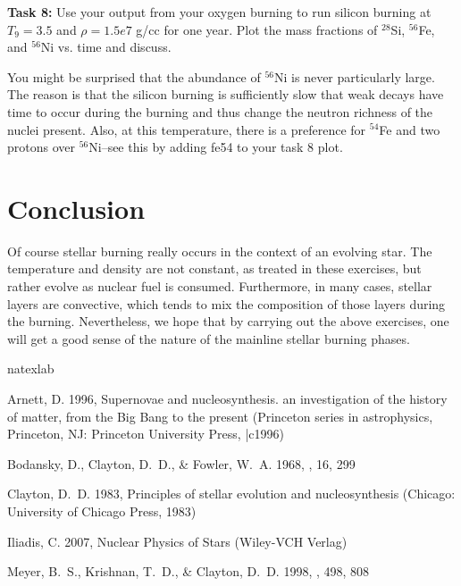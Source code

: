 \documentclass[manuscript]{aastex62}
\begin{document}
{\bf Task 8:}  Use your output from your oxygen burning to run silicon burning
at $T_9 = 3.5$ and $\rho = 1.5e7$ g/cc for one year.
Plot the mass fractions of
$^{28}$Si, $^{56}$Fe, and $^{56}$Ni vs. time and discuss.

You might be surprised that the abundance of $^{56}$Ni is never particularly
large.  The reason is that the silicon burning is sufficiently slow that
weak decays have time to occur during the burning and thus change the
neutron richness of the nuclei present.  Also, at this temperature, there
is a preference for $^{54}$Fe and two protons over $^{56}$Ni--see this by
adding fe54 to your task 8 plot.

\section{Conclusion}

Of course stellar burning really occurs in the context of an evolving star.
The temperature and density are not constant, as treated in these exercises,
but rather evolve as nuclear fuel is consumed.  Furthermore, in many cases,
stellar layers are convective, which tends to mix the composition of those
layers during the burning.  
Nevertheless, we hope that by
carrying out the above exercises, one will get a good sense of the
nature of the mainline stellar burning phases.

\begin{thebibliography}{5}
\expandafter\ifx\csname natexlab\endcsname\relax\def\natexlab#1{#1}\fi

{Arnett}, D. 1996, {Supernovae and nucleosynthesis. an investigation of the
  history of matter, from the Big Bang to the present} (Princeton series in
  astrophysics, Princeton, NJ: Princeton University Press, |c1996)

{Bodansky}, D., {Clayton}, D.~D., \& {Fowler}, W.~A. 1968, \apjs, 16, 299

{Clayton}, D.~D. 1983, {Principles of stellar evolution and nucleosynthesis}
  (Chicago: University of Chicago Press, 1983)

{Iliadis}, C. 2007, {Nuclear Physics of Stars} (Wiley-VCH Verlag)

{Meyer}, B.~S., {Krishnan}, T.~D., \& {Clayton}, D.~D. 1998, \apj, 498, 808

\end{thebibliography}
\end{document}
